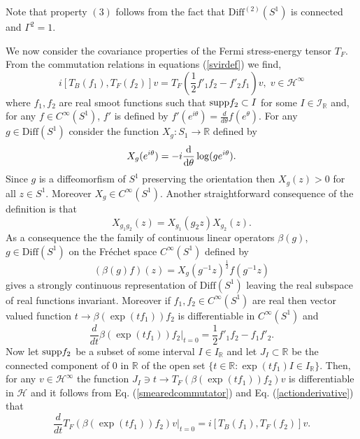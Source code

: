\documentclass[11pt]{article}
\def\I{{\cal I}}
\def\H{{\cal H}}
\def\Diff{{\rm Diff}}
\def\Diff{{\mathrm {Diff}}}
\def\RR{{\mathbb R}}
\def\H{{\mathcal H}}
\def\I{{\mathcal I}}
\begin{document}
Note that property $(3)$ follows from the fact that $\Diff^{(2)}(S^1)$ is 
connected and $\Gamma^2=1$. 

We now consider the covariance properties of the Fermi stress-energy
tensor $T_F$. From the commutation relations in equations (\ref{svirdef})
we find,  
\begin{equation}
\label{smearedcommutator}
i[T_B(f_1), T_F(f_2)]v = T_F(\frac{1}{2}f'_1f_2-f'_2f_1)v, \; v\in 
\H^\infty
\end{equation}
where $f_1, f_2$ are real smoot functions such that 
${\rm supp} f_2 \subset I$ for some $I\in \I_\RR$ and, for any
$f\in C^{\infty}(S^1)$, 
$f'$ is defined by $f'(e^{i\theta})=\frac{d}{d\theta}f(e^{\theta})$.  
For any $g \in \Diff(S^1)$ consider the function 
$X_g:S_1 \to \RR$ defined by
\begin{equation}
X_g(e^{i\theta})= -i\frac{{\rm d}}{{\rm d}\theta}\log (ge^{i\theta}).
\end{equation}
Since $g$ is a diffeomorfism of $S^1$ preserving the orientation 
then $X_g(z)>0$ for all $z \in S^1$. Moreover $X_g \in C^\infty(S^1)$. 
Another straightforward consequence of the definition is that 
\begin{equation}
X_{g_1g_2}(z)=X_{g_1}(g_2z)X_{g_2}(z). 
\end{equation}
As a consequence the the family of continuous linear operators 
$\beta(g)$, $g\in \Diff (S^1)$  on the Fr\'echet space $C^\infty(S^1)$ 
defined by 
\begin{equation}
(\beta(g)f)(z)= X_g(g^{-1}z)^{\frac12}f(g^{-1}z)
\end{equation}
gives a strongly continuous representation of $\Diff (S^1)$ leaving 
the real subspace of real functions invariant. Moreover if 
$f_1, f_2\in C^\infty(S^1)$ are real then vector valued function 
$t \to \beta(\exp(tf_1))f_2$ is differentiable in $C^\infty(S^1)$ and
\begin{equation}
\label{actionderivative}
\frac{d}{dt}\beta(\exp(tf_1))f_2|_{t=0}=\frac{1}{2}f'_1f_2-f_1f'_2.
\end{equation}  
Now let ${\rm supp} f_2$ be a subset of some interval $I \in I_\RR$ 
and let $J_I\subset \RR$ be the connected component of $0$ in $\RR$ 
of the open set $\{t\in \RR:\exp(tf_1)I \in I_\RR \}$. Then, for any 
$v\in \H^\infty$ the function $J_I \ni t \to T_F(\beta(\exp(tf_1))f_2)v$ 
is differentiable in $\H$ and it follows from Eq. 
(\ref{smearedcommutator}) and Eq. (\ref{actionderivative}) 
that 
\begin{equation}
\label{dTF} 
\frac{d}{dt}T_F(\beta(\exp(tf_1))f_2)v|_{t=0}=i[T_B(f_1), T_F(f_2)]v.
\end{equation}
\end{document}
